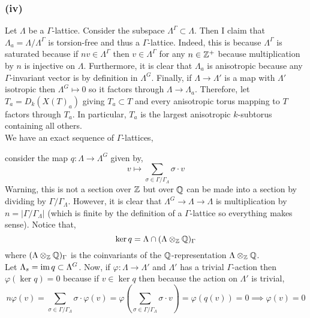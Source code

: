 \documentclass[12pt]{article}
\begin{document}
\subsubsection{(iv)}

Let $\Lambda$ be a $\Gamma$-lattice. Consider the subspace $\Lambda^\Gamma \subset \Lambda$. Then I claim that $\Lambda_a = \Lambda / \Lambda^\Gamma$ is torsion-free and thus a $\Gamma$-lattice. Indeed, this is because $\Lambda^\Gamma$ is saturated because if $n v \in \Lambda^\Gamma$ then $v \in \Lambda^\Gamma$ for any $n \in \mathbb{Z}^+$ because multiplication by $n$ is injective on $\Lambda$. Furthermore, it is clear that $\Lambda_a$ is anisotropic because any $\Gamma$-invariant vector is by definition in $\Lambda^G$. Finally, if $\Lambda \to \Lambda'$ is a map with $\Lambda'$ isotropic then $\Lambda^G \mapsto 0$ so it factors through $\Lambda \to \Lambda_a$. Therefore, let $T_a = D_k(X(T)_a)$ giving $T_a \subset T$ and every anisotropic torus mapping to $T$ factors through $T_a$. In particular, $T_a$ is the largest anisotropic $k$-subtorus containing all others.
\bigskip\\
We have an exact sequence of $\Gamma$-lattices,
\begin{center}
\end{center}
consider the map $q : \Lambda \to \Lambda^G$ given by,
\[ v \mapsto \sum_{\sigma \in \Gamma/\Gamma_\Lambda} \sigma \cdot v \]
Warning, this is not a section over $\mathbb{Z}$ but over $\mathbb{Q}$ can be made into a section by dividing by $\Gamma / \Gamma_\Lambda$. However, it is clear that $\Lambda^G \to \Lambda \to \Lambda$ is multiplication by $n = | \Gamma / \Gamma_\Lambda |$ (which is finite by the definition of a $\Gamma$-lattice so everything makes sense). Notice that,
\[ \ker{q} = \Lambda \cap (\Lambda \otimes_{\mathbb{Z}} \mathbb{Q})_\Gamma \]
where $(\Lambda \otimes_{\mathbb{Z}} \mathbb{Q})_\Gamma$ is the coinvariants of the $\mathbb{Q}$-representation $\Lambda \otimes_{\mathbb{Z}} \mathbb{Q}$.
\bigskip\\
Let $\Lambda_s = \operatorname{\mathrm{im}}{q} \subset \Lambda^G$. Now, if $\varphi : \Lambda \to \Lambda'$ and $\Lambda'$ has a trivial $\Gamma$-action then $\varphi(\ker{q}) = 0$ because if $v \in \ker{q}$ then because the action on $\Lambda'$ is trivial,
\[ n \varphi(v) = \sum_{\sigma \in \Gamma / \Gamma_\Lambda} \sigma \cdot \varphi(v) = \varphi \left( \sum_{\sigma \in \Gamma / \Gamma_\Lambda} \sigma \cdot v \right) = \varphi(q(v)) = 0 \implies \varphi(v) = 0 \]
\end{document}
